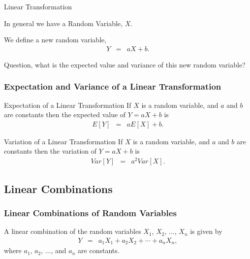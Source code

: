 \begin{frame}{Linear Transformation}

  In general we have a Random Variable, $X$.

  \vfill

  We define a new random variable,
  \begin{eqnarray*}
    Y & = & a X + b.
  \end{eqnarray*}

  \vfill

  Question, what is the expected value and variance of this new random
  variable?

  
\end{frame}


\begin{frame}
  \frametitle{Expectation and Variance of a Linear Transformation}

  \begin{block}{Expectation of a Linear Transformation}
    If $X$ is a random variable, and $a$ and $b$ are constants then
    the expected value of $Y=aX+b$ is 
    \begin{eqnarray*}
      E[Y] & = & a E[X] + b.
    \end{eqnarray*}
  \end{block}

  \begin{block}{Variation of a Linear Transformation}
    If $X$ is a random variable, and $a$ and $b$ are constants then
    the variation of $Y=aX+b$ is 
    \begin{eqnarray*}
      Var[Y] & = & a^2 Var[X].
    \end{eqnarray*}
  \end{block}

  
\end{frame}

\subsection{Linear Combinations}

\begin{frame}
  \frametitle{Linear Combinations of Random Variables}

  A linear combination of the random variables $X_1$, $X_2$, $\ldots$,
  $X_n$ is given by
  \begin{eqnarray*}
    Y & = & a_1 X_1 + a_2 X_2 + \cdots + a_n X_n,
  \end{eqnarray*}
  where $a_1$, $a_2$, $\ldots$, and $a_n$ are constants.
  
\end{frame}

